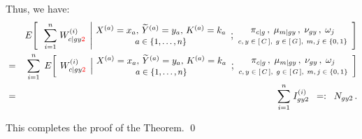 \begin{enumerate}
	Thus, we have:
	\begin{eqnarray*}
	&&
		E\!\left[\;\;
			\left.
			\overset{n}{\underset{i=1}{\sum}} \; W^{(i)}_{c \vert gy{\color{red}2}}
			\,\;\right\vert
			\!\!
			\EMConditionsWithValues
		\right]
	\\
	&=&
		\overset{n}{\underset{i=1}{\sum}} \;\,
		E\!\left[\;
			\left.
			W^{(i)}_{c \vert gy{\color{red}2}}
			\,\;\right\vert
			\!\!
			\EMConditionsWithValues
		\right]
	\\
	&=&
		\overset{n}{\underset{i=1}{\sum}} \;
		I^{(i)}_{gy2}
	\;\; =: \;\; 
		N_{gy2}\,.
	\end{eqnarray*}
\end{enumerate}
This completes the proof of the Theorem. \qed



\renewcommand{\theenumi}{\roman{enumi}}
\renewcommand{\labelenumi}{\textnormal{(\theenumi)}$\;\;$}

